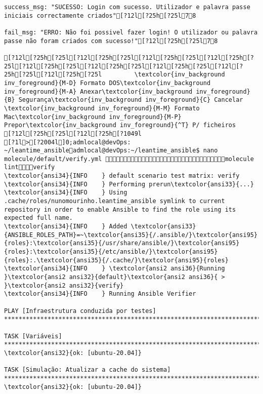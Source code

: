\documentclass{scrartcl}
\begin{document}
\begin{Verbatim}
success_msg: "SUCESSO: Login com sucesso. Utilizador e palavra passe iniciais correctamente criados"[?12l[?25h[?25l78

fail_msg: "ERRO: Não foi possivel fazer login! O utilizador ou palavra passe não foram criados com sucesso!"[?12l[?25h[?25l78

[?12l[?25h[?25l[?12l[?25h[?25l[?12l[?25h[?25l[?12l[?25h[?25l[?12l[?25h[?25l[?12l[?25h[?25l[?12l[?25h[?25l[?12l[?25h[?25l[?12l[?25h[?25l         \textcolor{inv_background inv_foreground}{M-D} Formato DOS\textcolor{inv_background inv_foreground}{M-A} Anexar\textcolor{inv_background inv_foreground}{B} Segurança\textcolor{inv_background inv_foreground}{C} Cancelar           \textcolor{inv_background inv_foreground}{M-M} Formato Mac\textcolor{inv_background inv_foreground}{M-P} Prepor\textcolor{inv_background inv_foreground}{^T} P/ ficheiros
[?12l[?25h[?25l[?12l[?25h[?1049l
[?1l>[?2004l]0;admlocal@devOps: ~/leantime_ansibleadmlocal@devOps:~/leantime_ansible$ nano molecule/default/verify.yml molecule lintverify
\textcolor{ansi34}{INFO    } default scenario test matrix: verify
\textcolor{ansi34}{INFO    } Performing prerun\textcolor{ansi33}{...}
\textcolor{ansi34}{INFO    } Using .cache/roles/nunomourinho.leantime_ansible symlink to current repository in order to enable Ansible to find the role using its expected full name.
\textcolor{ansi34}{INFO    } Added \textcolor{ansi33}{ANSIBLE_ROLES_PATH}=~\textcolor{ansi35}{/.ansible/}\textcolor{ansi95}{roles}:\textcolor{ansi35}{/usr/share/ansible/}\textcolor{ansi95}{roles}:\textcolor{ansi35}{/etc/ansible/}\textcolor{ansi95}{roles}:.\textcolor{ansi35}{/.cache/}\textcolor{ansi95}{roles}
\textcolor{ansi34}{INFO    } \textcolor{ansi2 ansi36}{Running }\textcolor{ansi2 ansi32}{default}\textcolor{ansi2 ansi36}{ > }\textcolor{ansi2 ansi32}{verify}
\textcolor{ansi34}{INFO    } Running Ansible Verifier

PLAY [Infraestrutura conduzida por testes] ***********************************************************************************************

TASK [Variáveis] *************************************************************************************************************************
\textcolor{ansi32}{ok: [ubuntu-20.04]}

TASK [Simulação: Atualizar a cache do sistema] *******************************************************************************************
\textcolor{ansi32}{ok: [ubuntu-20.04]}


\end{Verbatim}
\end{document}
